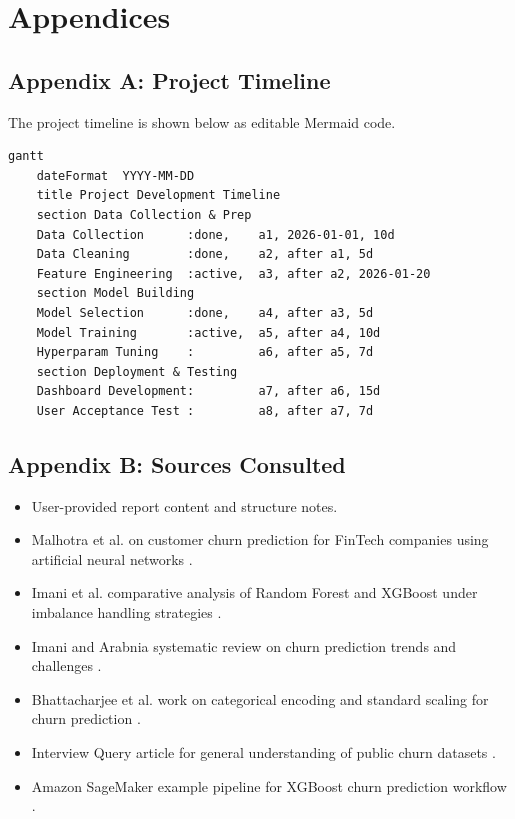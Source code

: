 \clearpage
{}
{}
\chapter*{Appendices}

\section*{Appendix A: Project Timeline}
The project timeline is shown below as editable Mermaid code.

\begin{lstlisting}[language={},caption={Project Development Timeline in Mermaid},label={lst:gantt}]
gantt
    dateFormat  YYYY-MM-DD
    title Project Development Timeline
    section Data Collection & Prep
    Data Collection      :done,    a1, 2026-01-01, 10d
    Data Cleaning        :done,    a2, after a1, 5d
    Feature Engineering  :active,  a3, after a2, 2026-01-20
    section Model Building
    Model Selection      :done,    a4, after a3, 5d
    Model Training       :active,  a5, after a4, 10d
    Hyperparam Tuning    :         a6, after a5, 7d
    section Deployment & Testing
    Dashboard Development:         a7, after a6, 15d
    User Acceptance Test :         a8, after a7, 7d
\end{lstlisting}

\section*{Appendix B: Sources Consulted}
\begin{itemize}
    \item User-provided report content and structure notes.
    \item Malhotra et al. on customer churn prediction for FinTech companies using artificial neural networks \cite{malhotra2017}.
    \item Imani et al. comparative analysis of Random Forest and XGBoost under imbalance handling strategies \cite{imani2024}.
    \item Imani and Arabnia systematic review on churn prediction trends and challenges \cite{systematicreview}.
    \item Bhattacharjee et al. work on categorical encoding and standard scaling for churn prediction \cite{bhattacharjee2026}.
    \item Interview Query article for general understanding of public churn datasets \cite{interviewquery2025}.
    \item Amazon SageMaker example pipeline for XGBoost churn prediction workflow \cite{sagemakerxgb}.
\end{itemize}

